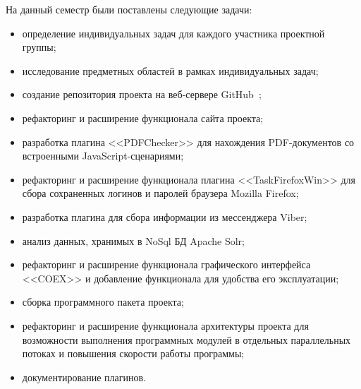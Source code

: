 На данный семестр были поставлены следующие задачи:

\begin{itemize}
  \item определение индивидуальных задач для каждого участника проектной группы;
  \item исследование предметных областей в рамках индивидуальных задач; 
  \item создание репозитория проекта на веб-сервере GitHub~\cite{github};
  \item рефакторинг и расширение функционала сайта проекта;
  \item разработка плагина <<PDFChecker>> для нахождения PDF-документов со встроенными JavaScript-сценариями;
  \item рефакторинг и расширение функционала плагина <<TaskFirefoxWin>> для сбора сохраненных логинов и паролей браузера Mozilla Firefox;
  \item разработка плагина для сбора информации из мессенджера Viber;
  \item анализ данных, хранимых в NoSql БД Apache Solr;
  \item рефакторинг и расширение функционала графического интерфейса <<COEX>> и добавление функционала для удобства его эксплуатации;
  \item сборка программного пакета проекта;  
  \item рефакторинг и расширение функционала архитектуры проекта для возможности выполнения программных модулей в отдельных параллельных потоках и повышения скорости работы программы;
  \item документирование плагинов.
\end{itemize}
